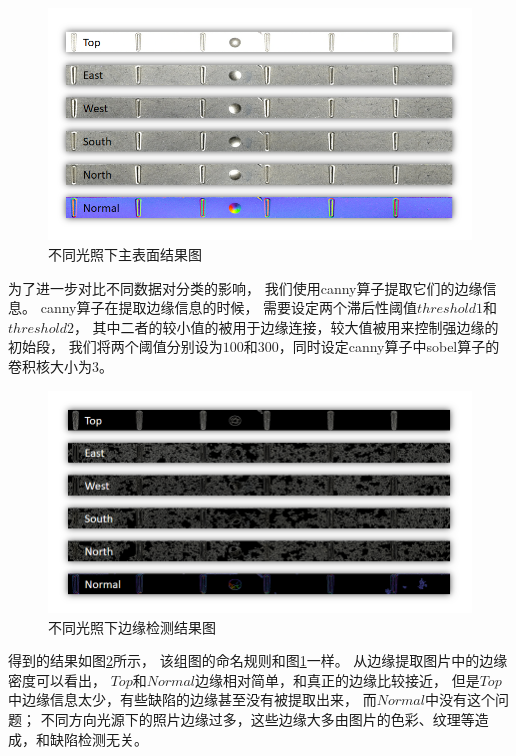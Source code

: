 \begin{figure}[htbp]
\centering
\includegraphics[width=1.0\linewidth]{figures/butongdengguangzhankaitu.png}
\caption{不同光照下主表面结果图}
\label{fig:butogndengguangzhankaitu}
\end{figure}

为了进一步对比不同数据对分类的影响，
我们使用canny\cite{canny1983finding}算子提取它们的边缘信息。
canny算子在提取边缘信息的时候，
需要设定两个滞后性阈值$threshold1$和$threshold2$，
其中二者的较小值的被用于边缘连接，较大值被用来控制强边缘的初始段，
我们将两个阈值分别设为$100$和$300$，同时设定canny算子中sobel算子的卷积核大小为$3$。
\begin{figure}[htbp]
\centering
\includegraphics[width=1.0\linewidth]{figures/butongdengguangcanny.png}
\caption{不同光照下边缘检测结果图}
\label{fig:butongdengguangcanny}
\end{figure}
得到的结果如图\ref{fig:butongdengguangcanny}所示，
该组图的命名规则和图\ref{fig:butogndengguangzhankaitu}一样。
从边缘提取图片中的边缘密度可以看出，
$Top$和$Normal$边缘相对简单，和真正的边缘比较接近，
但是$Top$中边缘信息太少，有些缺陷的边缘甚至没有被提取出来，
而$Normal$中没有这个问题；
不同方向光源下的照片边缘过多，这些边缘大多由图片的色彩、纹理等造成，和缺陷检测无关。



